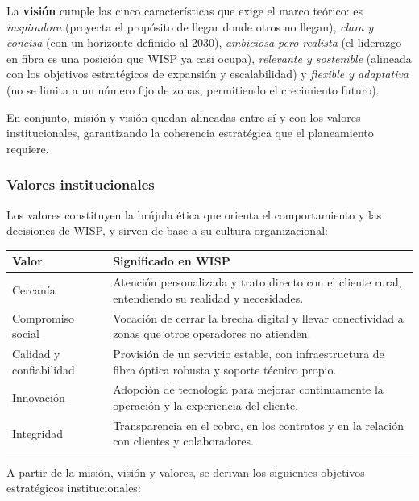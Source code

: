 La \textbf{visión} cumple las cinco características que exige el marco teórico:
es \emph{inspiradora} (proyecta el propósito de llegar donde otros no llegan),
\emph{clara y concisa} (con un horizonte definido al 2030), \emph{ambiciosa
pero realista} (el liderazgo en fibra es una posición que WISP ya casi
ocupa), \emph{relevante y sostenible} (alineada con los objetivos estratégicos
de expansión y escalabilidad) y \emph{flexible y adaptativa} (no se limita a un
número fijo de zonas, permitiendo el crecimiento futuro).

En conjunto, misión y visión quedan alineadas entre sí y con los valores
institucionales, garantizando la coherencia estratégica que el planeamiento
requiere.

\subsubsection{Valores institucionales}

Los valores constituyen la brújula ética que orienta el comportamiento y las
decisiones de WISP, y sirven de base a su cultura organizacional:

\begin{center}
\label{tab:valores}
\begin{tabularx}{\textwidth}{L{3.4cm} X}
\toprule
\textbf{Valor} & \textbf{Significado en WISP} \\
\midrule
Cercanía & Atención personalizada y trato directo con el cliente rural, entendiendo su realidad y necesidades. \\
Compromiso social & Vocación de cerrar la brecha digital y llevar conectividad a zonas que otros operadores no atienden. \\
Calidad y confiabilidad & Provisión de un servicio estable, con infraestructura de fibra óptica robusta y soporte técnico propio. \\
Innovación & Adopción de tecnología para mejorar continuamente la operación y la experiencia del cliente. \\
Integridad & Transparencia en el cobro, en los contratos y en la relación con clientes y colaboradores. \\
\bottomrule
\end{tabularx}
\end{center}

A partir de la misión, visión y valores, se derivan los siguientes objetivos
estratégicos institucionales:

